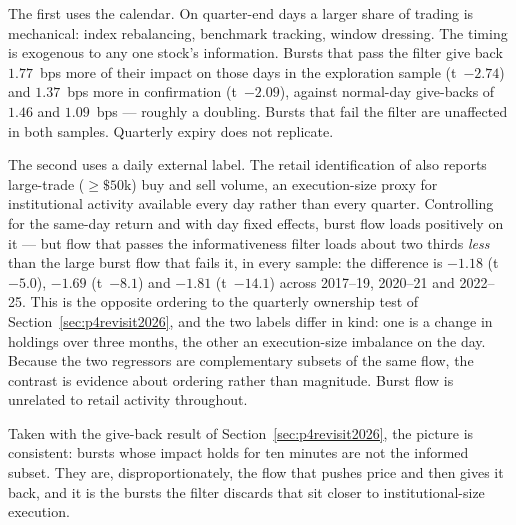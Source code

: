 \documentclass[11pt]{article}
\begin{document}
The first uses the calendar. On quarter-end days a larger share of trading is mechanical: index rebalancing,
benchmark tracking, window dressing. The timing is exogenous to any one stock's information. Bursts that pass
the filter give back $1.77$~bps more of their impact on those days in the exploration sample (t~$-2.74$) and
$1.37$~bps more in confirmation (t~$-2.09$), against normal-day give-backs of $1.46$ and $1.09$~bps --- roughly
a doubling. Bursts that fail the filter are unaffected in both samples. Quarterly expiry does not replicate.

The second uses a daily external label. The retail identification of \citet{boehmer2021} also reports
large-trade ($\geq\$50$k) buy and sell volume, an execution-size proxy for institutional activity available
every day rather than every quarter. Controlling for the same-day return and with day fixed effects, burst flow
loads positively on it --- but flow that passes the informativeness filter loads about two thirds \emph{less}
than the large burst flow that fails it, in every sample: the difference is $-1.18$ (t~$-5.0$), $-1.69$
(t~$-8.1$) and $-1.81$ (t~$-14.1$) across 2017--19, 2020--21 and 2022--25. This is the opposite ordering to the
quarterly ownership test of Section~\ref{sec:p4revisit2026}, and the two labels differ in kind: one is a change
in holdings over three months, the other an execution-size imbalance on the day. Because the two regressors are
complementary subsets of the same flow, the contrast is evidence about ordering rather than magnitude. Burst
flow is unrelated to retail activity throughout.

Taken with the give-back result of Section~\ref{sec:p4revisit2026}, the picture is consistent: bursts whose
impact holds for ten minutes are not the informed subset. They are, disproportionately, the flow that pushes
price and then gives it back, and it is the bursts the filter discards that sit closer to institutional-size
execution.


\end{document}
